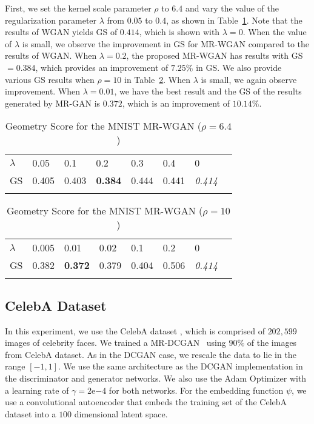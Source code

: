\documentclass[10pt,twocolumn,letterpaper]{article}
\begin{document}
First, we set the kernel scale parameter $\rho$ to $6.4$ and vary the value of the regularization parameter $\lambda$ from $0.05$ to $0.4$, as shown in Table~\ref{rho64}. Note that the results of WGAN yields GS of $0.414$, which is shown with $\lambda=0$. When the value of $\lambda$ is small, we observe the improvement in GS for MR-WGAN compared to the results of WGAN. When $\lambda=0.2$, the proposed MR-WGAN has results with GS $=0.384$, which provides an improvement of $7.25\%$ in GS. We also provide various GS results when $\rho=10$ in Table~\ref{rho10}. When $\lambda$ is small, we again observe improvement. When $\lambda=0.01$, we have the best result and the GS of the results generated by MR-GAN is $0.372$, which is an improvement of $10.14\%$.
\begin{table}[h]
\centering
\caption{Geometry Score for the MNIST MR-WGAN ($\rho=6.4$)}
\begin{tabular}{llllllll}
\hline
$\lambda$ & 0.05 & 0.1 & 0.2 & 0.3 & 0.4  &0\\
GS & 0.405 & 0.403 & {\bf0.384} & 0.444 & 0.441 & {\textit {0.414}}\\\hline
\label{rho64}
\end{tabular}
\end{table}
\vspace{-0.2in}
\begin{table}[h]
\centering
\caption{Geometry Score for the MNIST MR-WGAN ($\rho=10$)}
\begin{tabular}{llllllll}
\hline
$\lambda$ & 0.005 & 0.01 & 0.02 & 0.1 & 0.2 & 0 \\
GS & 0.382 & {\bf 0.372} & {0.379} & 0.404 & 0.506 & {\textit{0.414}}\\\hline
\label{rho10}
\end{tabular}
\end{table}

\vspace{-0.1in}
\subsection{CelebA Dataset}
In this experiment, we use the CelebA dataset \cite{liu2015faceattributes}, which is comprised of $202,599$ images of celebrity faces. We trained a MR-DCGAN~\cite{radford2015unsupervised} using $90\%$ of the images from CelebA dataset. As in the DCGAN case, we rescale the data to lie in the range $[-1,1]$. We use the same architecture as the DCGAN implementation in the discriminator and generator networks. We also use the Adam Optimizer with a learning rate of $\gamma = 2\mathrm{e}{-4}$ for both networks. For the embedding function $\psi$, we use a convolutional autoencoder that embeds the training set of the CelebA dataset into a $100$ dimensional latent space.  
\end{document}
